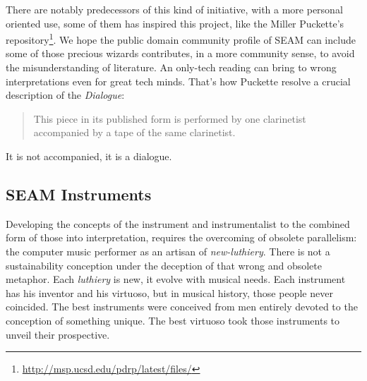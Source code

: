 \documentclass[twoside,a4paper]{article}
\begin{document}
There are notably predecessors of this kind of initiative, with a more personal oriented use, some of them has inspired this project, like the Miller Puckette's repository\footnote{\url{http://msp.ucsd.edu/pdrp/latest/files/}}. We hope the public domain community profile of SEAM can include some of those precious wizards contributes, in a more community sense, to avoid the misunderstanding of literature. An only-tech reading can bring to wrong interpretations even for great tech minds. That's how Puckette \cite{mp01} resolve a crucial description of the \emph{Dialogue}:

\begin{quote}
This piece in its published form is performed by one clarinetist accompanied by a tape of the same clarinetist.
\end{quote}

It is not accompanied, it is a dialogue.


\subsection{SEAM Instruments}

Developing the concepts of the instrument and instrumentalist to the combined form of those into interpretation, \cite{lem16,mp01,savi85} requires the overcoming of obsolete parallelism: the computer music performer as an artisan of \emph{new-luthiery}. There is not a sustainability conception under the deception of that wrong and obsolete metaphor. Each \emph{luthiery} is new, it evolve with musical needs. Each instrument has his inventor and his virtuoso, but in musical history, those people never coincided. The best instruments were conceived from men entirely devoted to the conception of something unique. The best virtuoso took those instruments to unveil their prospective.

\end{document}
